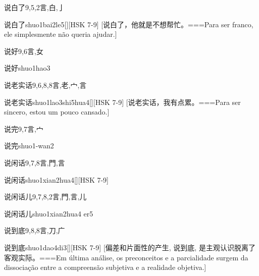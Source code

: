 \begin{Entry}{说白了}{9,5,2}{⾔,⽩,⼅}
  \begin{Phonetics}{说白了}{shuo1bai2le5}[][HSK 7-9]
    [说白了，他就是不想帮忙。===Para ser franco, ele simplesmente não queria ajudar.]
  \end{Phonetics}
\end{Entry}

\begin{Entry}{说好}{9,6}{⾔,⼥}
  \begin{Phonetics}{说好}{shuo1hao3}
  \end{Phonetics}
\end{Entry}

\begin{Entry}{说老实话}{9,6,8,8}{⾔,⽼,⼧,⾔}
  \begin{Phonetics}{说老实话}{shuo1lao3shi5hua4}[][HSK 7-9]
    [说老实话，我有点累。===Para ser sincero, estou um pouco cansado.]
  \end{Phonetics}
\end{Entry}

\begin{Entry}{说完}{9,7}{⾔,⼧}
  \begin{Phonetics}{说完}{shuo1-wan2}
  \end{Phonetics}
\end{Entry}

\begin{Entry}{说闲话}{9,7,8}{⾔,⾨,⾔}
  \begin{Phonetics}{说闲话}{shuo1xian2hua4}[][HSK 7-9]
  \end{Phonetics}
\end{Entry}

\begin{Entry}{说闲话儿}{9,7,8,2}{⾔,⾨,⾔,⼉}
  \begin{Phonetics}{说闲话儿}{shuo1xian2hua4 er5}
  \end{Phonetics}
\end{Entry}

\begin{Entry}{说到底}{9,8,8}{⾔,⼑,⼴}
  \begin{Phonetics}{说到底}{shuo1dao4di3}[][HSK 7-9]
    [偏差和片面性的产生, 说到底, 是主观认识脱离了客观实际。===Em última análise, os preconceitos e a parcialidade surgem da dissociação entre a compreensão subjetiva e a realidade objetiva.]
  \end{Phonetics}
\end{Entry}

